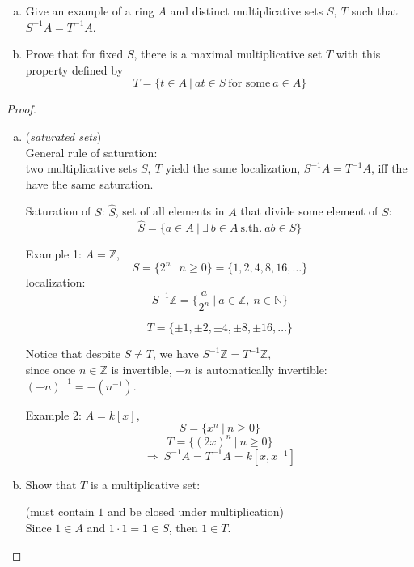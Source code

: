 \documentclass{article}
\theoremstyle{definition}
\newenvironment{ex}[1]
{\renewcommand\theinnerex{#1}\innerex}
{\endinnerex}
\begin{document}
\begin{ex}{R.6.4}
  \begin{enumerate}[a.]
  \item Give an example of a ring $A$ and distinct multiplicative sets $S,~ T$ such that $S^{-1}A = T^{-1}A$.
  \item Prove that for fixed $S$, there is a maximal multiplicative set $T$ with this property defined by
    $$T = \{ t \in A ~|~ at \in S ~\text{for some}~ a \in A \}$$
  \end{enumerate}
\end{ex}
\begin{proof}
  \begin{enumerate}[a.]
    \item
  (\emph{saturated sets})\\

  General rule of saturation:\\
  two multiplicative sets $S,~T$ yield the same localization, $S^{-1}A = T^{-1}A$, iff the have the same saturation.

  Saturation of $S$: $\hat{S}$, set of all elements in $A$ that divide some element of $S$:
  $$\hat{S} = \{ a \in A ~|~ \exists~ b \in A ~\text{s.th.}~ ab \in S \}$$

  \vspace{0.4cm}
  Example 1: $A=\mathbb{Z}$,\\

  $$S = \{ 2^n ~|~ n \geq 0 \} = \{ 1, 2, 4, 8, 16, \ldots \}$$
  localization:
  $$S^{-1} \mathbb{Z} = \{ \frac{a}{2^n} ~|~ a \in \mathbb{Z},~ n \in \mathbb{N} \}$$

  $$T = \{ \pm 1, \pm 2, \pm 4, \pm 8, \pm 16, \ldots \}$$

  Notice that despite $S \neq T$, we have $S^{-1}\mathbb{Z} = T^{-1} \mathbb{Z}$,\\
  since once $n \in \mathbb{Z}$ is invertible, $-n$ is automatically invertible: $(-n)^{-1} = - (n^{-1})$.

  \vspace{0.4cm}
  Example 2: $A= k[x]$,
  $$S = \{ x^n ~|~ n \geq 0 \}$$
  $$T = \{ (2x)^n ~|~ n \geq 0 \}$$
  $$\Longrightarrow~ S^{-1}A = T^{-1} A = k[x, x^{-1}]$$

  \item
    Show that $T$ is a multiplicative set:

    (must contain $1$ and be closed under multiplication)\\
    Since $1 \in A$ and $1 \cdot 1 = 1 \in S$, then $1 \in T$.


\end{enumerate}
\end{proof}
\end{document}
